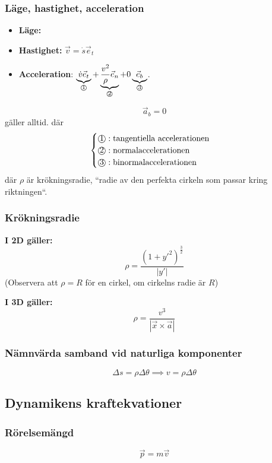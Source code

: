 \documentclass{article}
\newenvironment{ankiflashcard}[1][ ]{}{}
\newcommand{\numbercircle}[1]{
\text{\textcircled{#1}}
}
\newcommand{\numbercirclewithunderbrace}[2]{
\underbrace{#1}_{\numbercircle{#2}}
}
\begin{document}
\begin{paracol}{2}
\subsubsection{Läge, hastighet, acceleration}
\begin{itemize}
    \item \textbf{Läge:}
    \item \textbf{Hastighet:} $\vec v = \dot s \vec e_t$
    \item \textbf{Acceleration}: $\numbercirclewithunderbrace{\dot v \vec e_t}{1} + \numbercirclewithunderbrace{\frac{v^2}{\rho} \vec e_n}{2} + 0\numbercirclewithunderbrace{\vec e_b}{3}$. 
\end{itemize}
$$\vec a_b = 0$$ gäller alltid.
där $$\begin{cases}
    \numbercircle{1}: \text{tangentiella accelerationen}\\
    \numbercircle{2}: \text{normalaccelerationen} \\
    \numbercircle{3}: \text{binormalaccelerationen} \\
\end{cases}$$
där $\rho$ är krökningsradie, ``radie av den perfekta cirkeln som passar kring riktningen``.
\subsubsection{Krökningsradie}
\textbf{I 2D gäller:}
$$
\rho = \frac{(1+y'^2)^{\frac{3}{2}}}{\left| y' \right|}
$$
(Observera att $\rho = R$ för en cirkel, om cirkelns radie är $R$)


\textbf{I 3D gäller:}
$$
\rho = \frac{v^3}{\left| \vec x \times \vec a \right|}
$$
\subsubsection{Nämnvärda samband vid naturliga komponenter}

\begin{ankiflashcard}
    $$
    \Delta s = \rho \Delta \theta
    \implies v = \rho \Delta \theta   $$
\end{ankiflashcard}
\subsection{Dynamikens kraftekvationer}
\subsubsection{Rörelsemängd}
$$\vec p = m \vec v$$

\end{paracol}
\end{document}

